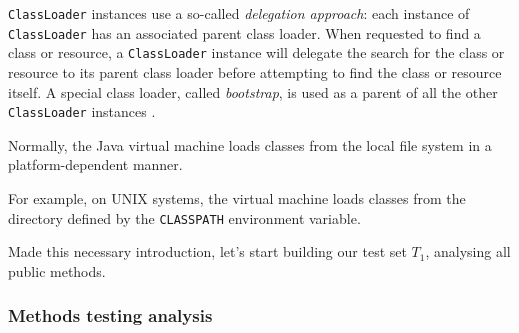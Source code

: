 \documentclass[sigconf]{acmart}
\begin{document}
\texttt{ClassLoader} instances use a so-called \textit{delegation approach}: each instance of \texttt{ClassLoader} has an associated parent class loader. When requested to find a class or resource, a \texttt{ClassLoader} instance will delegate the search for the class or resource to its parent class loader before attempting to find the class or resource itself. A special class loader, called \textit{bootstrap}, is used as a parent of all the other \texttt{ClassLoader} instances \cite{ClassLoader}. 

Normally, the Java virtual machine loads classes from the local file system in a platform-dependent manner. 

For example, on UNIX systems, the virtual machine loads classes from the directory defined by the \texttt{CLASSPATH} environment variable. 

Made this necessary introduction, let's start building our test set $T_1$, analysing all public methods.

\subsubsection{Methods testing analysis}
\end{document}
